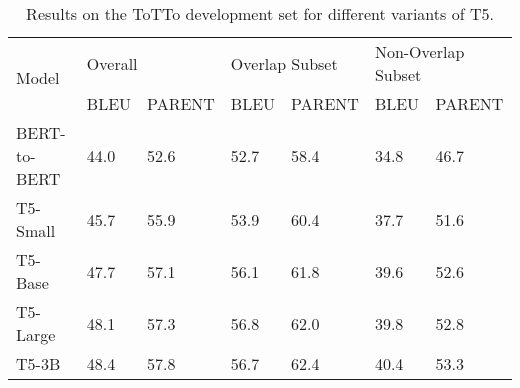 \documentclass[11pt,a4paper]{article}
\begin{document}
\begin{table*}[h]
\centering
\begin{tabular}{lllllll} \hline
\multirow{2}{*}{Model} & \multicolumn{2}{l}{Overall} & \multicolumn{2}{l}{Overlap Subset} & \multicolumn{2}{l}{Non-Overlap Subset} \\ 
                       & BLEU        & PARENT        & BLEU        & PARENT        & BLEU          & PARENT          \\ \hline
BERT-to-BERT      & 44.0        & 52.6          & 52.7            & 58.4             & 34.8             & 46.7   \\
T5-Small                  & 45.7        & 55.9         & 53.9        & 60.4         & 37.7          & 51.6           \\
T5-Base                   & 47.7        & 57.1         & 56.1        & 61.8         & 39.6          & 52.6           \\
T5-Large                  & 48.1        & 57.3         & 56.8        & 62.0         & 39.8          & 52.8           \\
T5-3B                     & 48.4        & 57.8          & 56.7        & 62.4          & 40.4          & 53.3      \\ \hline    
\end{tabular}
\caption{Results on the ToTTo development set for different variants of T5.}
\label{results-totto-dev}
\end{table*}
\end{document}
